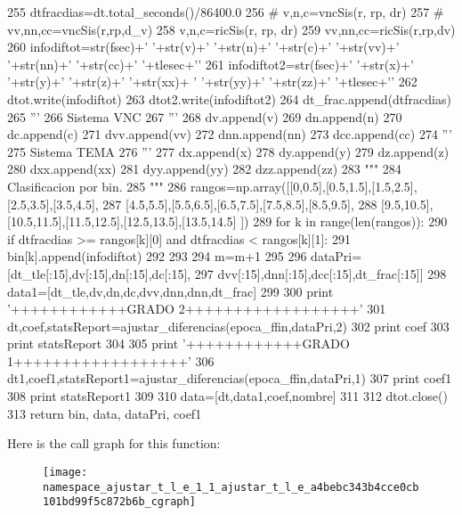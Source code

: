 \begin{DoxyCode}
255             dtfracdias=dt.total_seconds()/86400.0
256 #             v,n,c=vncSis(r, rp, dr)
257 #             vv,nn,cc=vncSis(r,rp,d_v)
258             v,n,c=ricSis(r, rp, dr)
259             vv,nn,cc=ricSis(r,rp,dv)
260             infodiftot=str(fsec)+' '+str(v)+' '+str(n)+' '+str(c)+' '+str(vv)+'
       '+str(nn)+' '+str(cc)+' '+tlesec+'\n'
261             infodiftot2=str(fsec)+' '+str(x)+' '+str(y)+' '+str(z)+' '+str(xx)+
      ' '+str(yy)+' '+str(zz)+' '+tlesec+'\n'
262             dtot.write(infodiftot)
263             dtot2.write(infodiftot2)
264             dt_frac.append(dtfracdias)
265             '''
266             Sistema VNC
267             '''
268             dv.append(v)
269             dn.append(n)
270             dc.append(c)
271             dvv.append(vv)
272             dnn.append(nn)
273             dcc.append(cc)
274             '''
275             Sistema TEMA
276             '''
277             dx.append(x)
278             dy.append(y)
279             dz.append(z)
280             dxx.append(xx)
281             dyy.append(yy)
282             dzz.append(zz)           
283             """
284             Clasificacion por bin.
285             """
286             rangos=np.array([[0,0.5],[0.5,1.5],[1.5,2.5],[2.5,3.5],[3.5,4.5],
287                      [4.5,5.5],[5.5,6.5],[6.5,7.5],[7.5,8.5],[8.5,9.5],
288                      [9.5,10.5],[10.5,11.5],[11.5,12.5],[12.5,13.5],[13.5,14.5]
      ])
289             for k in range(len(rangos)):
290                 if dtfracdias >= rangos[k][0] and dtfracdias < rangos[k][1]:
291                     bin[k].append(infodiftot)
292                     
293             
294         m=m+1 
295             
296     dataPri=[dt_tle[:15],dv[:15],dn[:15],dc[:15],
297              dvv[:15],dnn[:15],dcc[:15],dt_frac[:15]]    
298     data1=[dt_tle,dv,dn,dc,dvv,dnn,dnn,dt_frac]
299     
300     print '++++++++++++GRADO 2++++++++++++++++++'
301     dt,coef,statsReport=ajustar_diferencias(epoca_ffin,dataPri,2)
302     print coef
303     print statsReport
304     
305     print '++++++++++++GRADO 1++++++++++++++++++'
306     dt1,coef1,statsReport1=ajustar_diferencias(epoca_ffin,dataPri,1)
307     print coef1
308     print statsReport1
309     
310     data=[dt,data1,coef,nombre]
311         
312     dtot.close()
313     return bin, data, dataPri, coef1

\end{DoxyCode}


\-Here is the call graph for this function\-:\nopagebreak
\begin{figure}[H]
\begin{center}
\leavevmode
\texttt{[image: namespace\_ajustar\_t\_l\_e\_1\_1\_ajustar\_t\_l\_e\_a4bebc343b4cce0cb101bd99f5c872b6b\_cgraph]}
\end{center}
\end{figure}


